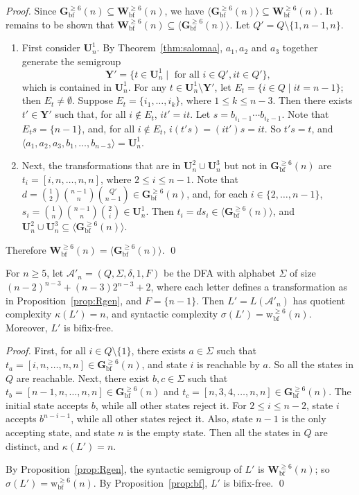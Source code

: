 \documentclass{llncs}
\renewcommand{\le}{\leqslant}
\renewcommand{\ge}{\geqslant}
\newcommand{\Sig}{\Sigma}
\newcommand{\be}{\begin{enumerate}}
\newcommand{\ee}{\end{enumerate}}
\newcommand{\txt}[1]{\mbox{ #1 }}
\newcommand{\cA}{{\mathcal A}}
\newcommand{\Wbf}{\mathbf{W}^{\ge 6}_{\mathrm{bf}}}
\newcommand{\Hbf}{\mathbf{G}^{\ge 6}_{\mathrm{bf}}}
\newcommand{\Uf}{\mathbf{U}}
\newcommand{\wbf}{{\mathrm{w}^{\ge 6}_{\mathrm{bf}}}}
\begin{document}
\begin{proof} 
Since $\Hbf(n) \subseteq \Wbf(n)$, we have $\langle \Hbf(n) \rangle \subseteq \Wbf(n)$. It remains to be shown that $\Wbf(n) \subseteq \langle \Hbf(n) \rangle$. Let $Q' = Q \setminus \{1,n-1,n\}$. 
\be 
\item First consider $\Uf^1_n$. By Theorem~\ref{thm:salomaa}, $a_1,a_2$ and $a_3$ together generate the semigroup $$\mathbf{Y}' = \{t \in \Uf^1_n \mid \txt{for all} i \in Q', it \in Q'\},$$ which is contained in $\Uf^1_n$. For any $t \in \Uf^1_n \setminus \mathbf{Y}'$, let $E_t = \{ i \in Q \mid it = n-1 \}$; then $E_t \neq \emptyset$. Suppose $E_t = \{i_1,\ldots,i_k\}$, where $1 \le k \le n-3$. Then there exists $t' \in \mathbf{Y}'$ such that, for all $i \not\in E_t$, $it' = it$. Let $s = b_{i_1-1} \cdots b_{i_k-1}$. Note that $E_ts = \{n-1\}$, and, for all $i \not\in E_t$, $i(t's) = (it')s = it$. So $t's = t$, and $\langle a_1,a_2,a_3,b_1,\ldots,b_{n-3} \rangle = \Uf^1_n$. 

\item Next, the transformations that are in $\Uf^2_n \cup \Uf^3_n$ but not in $\Hbf(n)$ are $t_i = [i,n,\ldots,n,n]$, where $2 \le i \le n-1$. Note that $d = {1 \choose 2}{n-1 \choose n}{Q' \choose n-1} \in \Hbf(n)$, and, for each $i \in \{2,\ldots,n-1\}$, $s_i = {1 \choose n}{n-1 \choose n}{2 \choose i} \in \Uf^1_n$. Then $t_i = ds_i \in \langle \Hbf(n) \rangle$, and $\Uf^2_n \cup \Uf^3_n \subseteq \langle \Hbf(n) \rangle$. 
\ee 

Therefore $\Wbf(n) = \langle \Hbf(n) \rangle$. \qed
\end{proof}


\begin{theorem}\label{thm:bfaut1} 
For $n \ge 5$, let $\cA'_n = (Q, \Sig, \delta, 1, F)$ be the DFA with alphabet $\Sig$ of size $(n-2)^{n-3} + (n-3)2^{n-3}+2$, where each letter defines a transformation as in Proposition~\ref{prop:Rgen}, and $F = \{n-1\}$. Then $L' = L(\cA'_n)$ has quotient complexity $\kappa(L') = n$, and syntactic complexity $\sigma(L') = \wbf(n)$. Moreover, $L'$ is bifix-free. 
\end{theorem}


\begin{proof} 
First, for all $i \in Q \setminus \{1\}$, there exists $a \in \Sig$ such that $t_a = [i, n, \ldots, n, n] \in \Hbf(n)$, and state $i$ is reachable by $a$. So all the states in $Q$ are reachable. Next, there exist $b, c \in \Sig$ such that $t_b = [n-1, n, \ldots, n, n] \in \Hbf(n)$ and $t_c = [n, 3, 4, \ldots, n, n] \in \Hbf(n)$. The initial state accepts $b$, while all other states reject it. For $2 \le i \le n-2$, state $i$ accepts $b^{n-i-1}$, while all other states reject it. Also, state $n-1$ is the only accepting state, and state $n$ is the empty state. Then all the states in $Q$ are distinct, and $\kappa(L') = n$. 

By Proposition~\ref{prop:Rgen}, the syntactic semigroup of $L'$ is $\Wbf(n)$; so $\sigma(L')=\wbf(n)$. By Proposition~\ref{prop:bf}, $L'$ is bifix-free. \qed
\end{proof}
\end{document}
